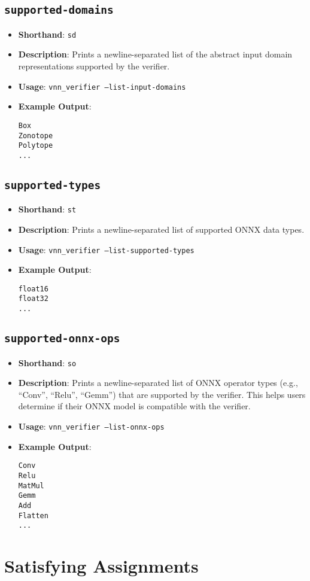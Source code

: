 \subsection{\texttt{supported-domains}}
\begin{itemize}
    \item \textbf{Shorthand}: \texttt{sd}
    \item \textbf{Description}: Prints a newline-separated list of the abstract input domain representations supported by the verifier. 
    \item \textbf{Usage}: \texttt{vnn\_verifier --list-input-domains}
    \item \textbf{Example Output}:
    \begin{lstlisting}[style=bash, numbers=none, frame=none, backgroundcolor=\color{white}]
Box
Zonotope
Polytope
...
    \end{lstlisting}
\end{itemize}

\subsection{\texttt{supported-types}}
\begin{itemize}
    \item \textbf{Shorthand}: \texttt{st}
    \item \textbf{Description}: Prints a newline-separated list of supported ONNX data types.
    \item \textbf{Usage}: \texttt{vnn\_verifier --list-supported-types}
    \item \textbf{Example Output}:
    \begin{lstlisting}[style=bash, numbers=none, frame=none, backgroundcolor=\color{white}]
float16
float32
...
    \end{lstlisting}
\end{itemize}


\subsection{\texttt{supported-onnx-ops}}
\begin{itemize}
    \item \textbf{Shorthand}: \texttt{so}
    \item \textbf{Description}: Prints a newline-separated list of ONNX operator types (e.g., ``Conv'', ``Relu'', ``Gemm'') that are supported by the verifier. 
	This helps users determine if their ONNX model is compatible with the verifier.
    \item \textbf{Usage}: \texttt{vnn\_verifier --list-onnx-ops}
    \item \textbf{Example Output}:
    \begin{lstlisting}[style=bash, numbers=none, frame=none, backgroundcolor=\color{white}]
Conv
Relu
MatMul
Gemm
Add
Flatten
...
    \end{lstlisting}
\end{itemize}


\section{Satisfying Assignments}\label{sec:satisfying_assignments}
